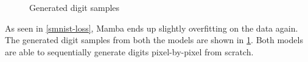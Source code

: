 \documentclass[12pt,a4paper]{report}
\begin{document}
\begin{figure}[ht]
\begin{minipage}[b]{0.45\textwidth}
        \caption{Generated digit samples}
        \label{smnist-gen}
    \end{minipage}
\end{figure}

As seen in \ref{smnist-loss}, Mamba ends up slightly overfitting on the data again. The generated digit samples from both the models are shown in \ref{smnist-gen}. Both models are able to sequentially generate digits pixel-by-pixel from scratch.

\printbibliography
\end{document}
